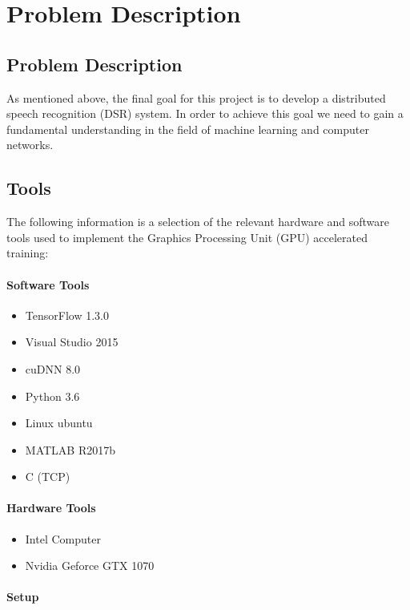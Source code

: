 \chapter{Problem Description}\label{ch:problem_description}

\section{Problem Description}

As mentioned above, the final goal for this project is to develop a distributed speech recognition (DSR) system.
In order to achieve this goal we need to gain a fundamental understanding in the field of machine learning and computer networks.

\section{Tools}
The following information is a selection of the relevant hardware and software tools used to implement the Graphics Processing Unit (GPU) accelerated training:
\subsubsection{Software Tools}
\begin{itemize}
	\item TensorFlow 1.3.0
	\item Visual Studio 2015
	\item cuDNN 8.0
	\item Python 3.6
	\item Linux ubuntu
	\item MATLAB  R2017b
	\item C (TCP)
\end{itemize}

\subsubsection{Hardware Tools}
\begin{itemize}
	\item Intel Computer
	\item Nvidia Geforce GTX 1070 
\end{itemize}

\subsubsection{Setup}

